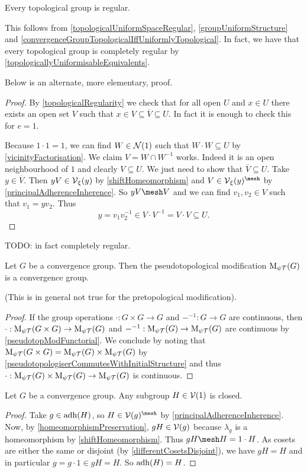 \begin{proposition} \label{topologicalGroupsRegular}
Every topological group is regular.
\end{proposition}
This follows from \ref{topologicalUniformSpaceRegular}, \ref{groupUniformStructure} and \ref{convergenceGroupTopologicalIffUniformlyTopological}.
In fact, we have that every topological group is completely regular by \ref{topologicallyUniformisableEquivalents}.

Below is an alternate, more elementary, proof.
\begin{proof}
By \ref{topologicalRegularity} we check that for all open $U$ and $x\in U$ there exists an open set $V$ such that $x\in V\subseteq \overline{V}\subseteq U$. In fact it is enough to check this for $e = 1$.\

Because $1\cdot 1 = 1$, we can find $W\in\operatorname{\mathcal{N}}(1)$ such that $W\cdot W \subseteq U$ by \ref{vicinityFactorisation}. We claim $V= W\cap W^{-1}$ works. Indeed it is an open neighbourhood of $1$ and clearly $V\subseteq U$. We just need to show that $\overline{V}\subseteq U$. Take $y\in \overline{V}$. Then $yV\in \operatorname{\mathcal{V}}_\xi(y)$ by \ref{shiftHomeomorphism} and $V\in \vicinities_\xi(y)^{\mesh}$ by \ref{principalAdherenceInherence}. So $yV\mesh V$ and we can find $v_1,v_2\in V$ such that $v_1 = yv_2$. Thus
\[ y = v_1v_2^{-1} \in V\cdot V^{-1} = V\cdot V \subseteq U. \]
\end{proof}
TODO: in fact completely regular.

\begin{proposition}
Let $G$ be a convergence group. Then the pseudotopological modification $\operatorname{M_{\psi\mathcal{T}}}(G)$ is a convergence
group.
\end{proposition}
(This is in general not true for the pretopological modification).
\begin{proof}
If the group operations $\cdot: G\times G\to G$ and $-^{-1}: G\to G$ are continuous, then $\cdot: \operatorname{M_{\psi\mathcal{T}}}(G\times G)\to \operatorname{M_{\psi\mathcal{T}}}(G)$ and $-^{-1}: \operatorname{M_{\psi\mathcal{T}}}(G)\to \operatorname{M_{\psi\mathcal{T}}}(G)$ are continuous by \ref{pseudotopModFunctorial}. We conclude by noting that $\operatorname{M_{\psi\mathcal{T}}}(G\times G) = \operatorname{M_{\psi\mathcal{T}}}(G)\times \operatorname{M_{\psi\mathcal{T}}}(G)$ by \ref{pseudotopologiserCommutesWithInitialStructure} and thus $\cdot: \operatorname{M_{\psi\mathcal{T}}}(G)\times \operatorname{M_{\psi\mathcal{T}}}(G)\to \operatorname{M_{\psi\mathcal{T}}}(G)$ is continuous.
\end{proof}

\begin{proposition}
Let $G$ be a convergence group. Any subgroup $H\in\operatorname{\mathcal{V}}(1)$ is closed.
\end{proposition}
\begin{proof}
Take $g\in \operatorname{adh}(H)$, so $H\in \vicinities(g)^{\mesh}$ by \ref{principalAdherenceInherence}. Now, by \ref{homeomorphismPreservation}, $gH\in \operatorname{\mathcal{V}}(g)$ because $\lambda_g$ is a homeomorphism by \ref{shiftHomeomorphism}. Thus $gH \mesh H = 1\cdot H$. As cosets are either the same or disjoint (by \ref{differentCosetsDisjoint}), we have $gH = H$ and in particular $g = g\cdot 1 \in gH = H$. So $\operatorname{adh}(H) = H$.
\end{proof}

